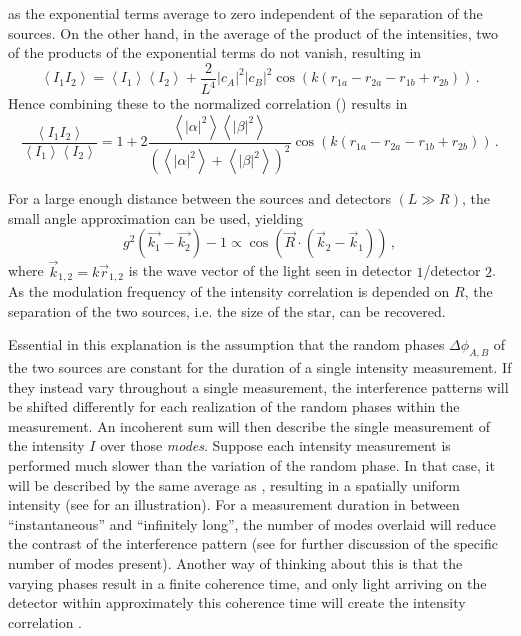 as the exponential terms average to zero independent of the separation of the sources. On the other hand, in the average of the product of the intensities, two of the products of the exponential terms do not vanish, resulting in
\begin{equation}
	\left\langle I_{1} I_{2}\right\rangle =
	\left\langle I_{1}\right\rangle\left\langle I_{2}\right\rangle+\frac{2}{L^{4}}|c_A|^{2}|c_B|^{2} \cos \left(k\left(r_{1 a}-r_{2 a}-r_{1 b}+r_{2 b}\right)\right) \,.
\end{equation}
Hence combining these to the normalized correlation () results in
\begin{equation}
	\frac{\left\langle I_{1} I_{2}\right\rangle}{\left\langle I_{1}\right\rangle\left\langle I_{2}\right\rangle}
	=1+2 \frac{\left\langle|\alpha|^{2}\right\rangle\left\langle|\beta|^{2}\right\rangle}{\left(\left\langle|\alpha|^{2}\right\rangle+\left\langle|\beta|^{2}\right\rangle\right)^{2}} \cos \left(k\left(r_{1 a}-r_{2 a}-r_{1 b}+r_{2 b}\right)\right) \,.
\end{equation}

For a large enough distance between the sources and detectors $(L \gg R)$, the small angle approximation can be used, yielding
\begin{equation}
	g^2\left(\vec{k_1}-\vec{k_2}\right)-1\propto \cos{\left(\vec{R} \cdot\left(\vec{k}_{2}-\vec{k}_{1}\right)\right)} \,,
\end{equation} 
where $\vec{k}_{1,2}=k \vec{r}_{1,2}$ is the wave vector of the light seen in detector $1$/detector $2$. As the modulation frequency of the intensity correlation is depended on $R$, the separation of the two sources, i.e. the size of the star, can be recovered. 

Essential in this explanation is the assumption that the random phases $\Delta\phi_{A,B}$ of the two sources are constant for the duration of a single intensity measurement. If they instead vary throughout a single measurement, the interference patterns will be shifted differently for each realization of the random phases within the measurement. An incoherent sum will then describe the single measurement of the intensity $I$ over those \textit{modes}. Suppose each intensity measurement is performed much slower than the variation of the random phase. In that case, it will be described by the same average as , resulting in a spatially uniform intensity (see  for an illustration). For a measurement duration in between \enquote{instantaneous} and \enquote{infinitely long}, the number of modes overlaid will reduce the contrast of the interference pattern (see  for further discussion of the specific number of modes present). Another way of thinking about this is that the varying phases result in a finite coherence time, and only light arriving on the detector within approximately this coherence time will create the intensity correlation \cite{goodman2000,loudon2000,baym1997}.


